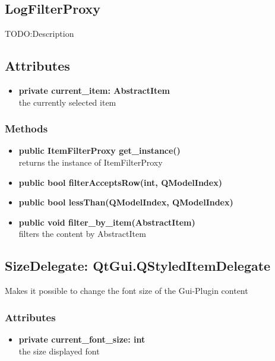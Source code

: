 \subsection{LogFilterProxy}
TODO:Description
\subsection{Attributes}
\begin{itemize}
  \item \textbf{private current\_item: AbstractItem}\\
  the currently selected item
\end{itemize}
\subsubsection{Methods}
\begin{itemize}
  
  \item \textbf{public ItemFilterProxy get\_instance()}\\
  returns the instance of ItemFilterProxy
  \item \textbf{public bool filterAcceptsRow(int, QModelIndex)}\\
  
  \item \textbf{public bool lessThan(QModelIndex, QModelIndex)}\\
  
  \item \textbf{public void filter\_by\_item(AbstractItem)}\\
  filters the content by AbstractItem
\end{itemize}

\subsection{SizeDelegate: QtGui.QStyledItemDelegate}
Makes it possible to change the font size of the Gui-Plugin content
\subsubsection{Attributes}
\begin{itemize}
  \item \textbf{private current\_font\_size: int}\\
  the size displayed font
\end{itemize}
